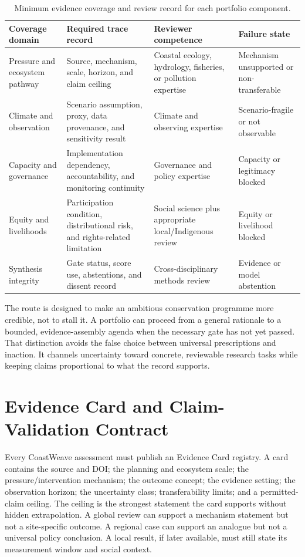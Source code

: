 \documentclass[conference]{IEEEtran}
\newcommand{\coast}{CoastWeave}
\begin{document}
\begin{table}[t]
\caption{Minimum evidence coverage and review record for each portfolio component.}
\label{tab:review}
\centering
\scriptsize
\renewcommand{\arraystretch}{1.12}
\begin{tabular}{|p{}|p{}|p{}|p{}|}
\hline
\textbf{Coverage domain} & \textbf{Required trace record} & \textbf{Reviewer competence} & \textbf{Failure state} \\
\hline
Pressure and ecosystem pathway & Source, mechanism, scale, horizon, and claim ceiling & Coastal ecology, hydrology, fisheries, or pollution expertise & Mechanism unsupported or non-transferable \\
\hline
Climate and observation & Scenario assumption, proxy, data provenance, and sensitivity result & Climate and observing expertise & Scenario-fragile or not observable \\
\hline
Capacity and governance & Implementation dependency, accountability, and monitoring continuity & Governance and policy expertise & Capacity or legitimacy blocked \\
\hline
Equity and livelihoods & Participation condition, distributional risk, and rights-related limitation & Social science plus appropriate local/Indigenous review & Equity or livelihood blocked \\
\hline
Synthesis integrity & Gate status, score use, abstentions, and dissent record & Cross-disciplinary methods review & Evidence or model abstention \\
\hline
\end{tabular}
\end{table}

The route is designed to make an ambitious conservation programme more credible, not to stall it. A portfolio can proceed from a general rationale to a bounded, evidence-assembly agenda when the necessary gate has not yet passed. That distinction avoids the false choice between universal prescriptions and inaction. It channels uncertainty toward concrete, reviewable research tasks while keeping claims proportional to what the record supports.

\section{Evidence Card and Claim-Validation Contract}

Every \coast{} assessment must publish an Evidence Card registry. A card contains the source and DOI; the planning and ecosystem scale; the pressure/intervention mechanism; the outcome concept; the evidence setting; the observation horizon; the uncertainty class; transferability limits; and a permitted-claim ceiling. The ceiling is the strongest statement the card supports without hidden extrapolation. A global review can support a mechanism statement but not a site-specific outcome. A regional case can support an analogue but not a universal policy conclusion. A local result, if later available, must still state its measurement window and social context.
\end{document}
